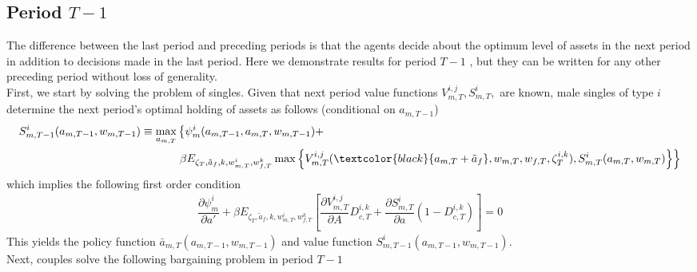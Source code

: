 \subsection{Period $T-1$}
The difference between the last period and preceding periods is that the agents decide about the optimum level of assets in the next period in addition to decisions made in the last period. Here we demonstrate results for period $T-1$ , but they can be written for any other preceding period without loss of generality. \\
First, we start by solving the problem of singles. Given that next period value functions $V_{m,T}^{i,j}, S_{m,T}^i,$ are known, male singles of type $i$ determine the next period's optimal holding of assets as follows (conditional on $a_{m, T-1}$)
\begin{align*}
S_{m,T-1}^i(a_{m, T-1}, w_{m, T-1}) \equiv \max_{a_{m,T}} & \left \{ \psi^i_m(a_{m,T-1}, a_{m,T}, w_{m,T-1}) + \right. \\
&\left. \beta E_{\zeta_T, \tilde a_f, k, w^i_{m,T}, w^k_{f,T}} \max  \left \{V_{m,T}^{i,j}(\textcolor{black}{a_{m,T}+ \tilde a_f}, w_{m, T}, w_{f,T}, \zeta^{i,k}_T), S_{m,T}^i(a_{m, T},  w_{m,T}) \right \} \right \}
\end{align*}
which implies the following first order condition 
\begin{align*}
\dfrac{\partial \psi_m^i}{\partial a'} + \beta E_{\zeta_T, \tilde a_f, k, w^i_{m,T}, w^k_{f,T}} \left[ \dfrac{\partial V_{m, T}^{i,j}}{\partial A}D_{c,T}^{i,k}  + \dfrac{\partial S_{m,T}^i}{\partial a}  (1 - D_{c,T}^{i,k} )\right] = 0
\end{align*}
This yields the policy function $\bar a_{m,T}(a_{m, T-1}, w_{m, T-1})$ and value function $S_{m,T-1}^i(a_{m, T-1}, w_{m, T-1})$. \\

Next, couples solve the following bargaining problem in period $T-1$

